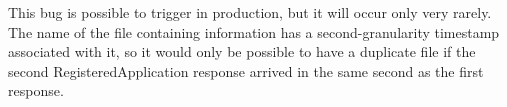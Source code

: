 This bug is possible to trigger in production, but it will occur only very
rarely. The name of the file containing information has a second-granularity timestamp associated
with it, so it would only be possible to have a duplicate file if the second
RegisteredApplication response arrived in the same second as the first
response.

% 
